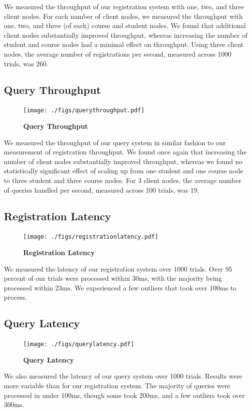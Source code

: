 \documentclass[sigplan, screen, 10pt]{acmart}
\begin{document}
We measured the throughput of our registration system with one, two, and three client nodes. For each number of client nodes, we measured the throughput with one, two, and three (of each) course and student nodes. We found that additional client nodes substantially improved throughput, whereas increasing the number of student and course nodes had a minimal effect on throughput. Using three client nodes, the average number of registrations per second, measured across 1000 trials, was 260.

\subsection{Query Throughput}
\begin{figure}[!htb]
  \centering
  \texttt{[image: ./figs/querythroughput.pdf]}
  \caption{
    \textbf{Query Throughput}
  }
\end{figure}
We measured the throughput of our query system in similar fashion to our measurement of registration throughput. We found once again that increasing the number of client nodes substantially improved throughput, whereas we found no statistically significant effect of scaling up from one student and one course node to three student and three course nodes. For 3 client nodes, the average number of queries handled per second, measured across 100 trials, was 19.

\subsection{Registration Latency}
\begin{figure}[!htb]
  \centering
  \texttt{[image: ./figs/registrationlatency.pdf]}
  \caption{
    \textbf{Registration Latency}
  }
\end{figure}
We measured the latency of our registration system over 1000 trials. Over 95 percent of our trials were processed within 30ms, with the majority being processed within 23ms. We experienced a few outliers that took over 100ms to process.

\subsection{Query Latency}
\begin{figure}[!htb]
  \centering
  \texttt{[image: ./figs/querylatency.pdf]}
  \caption{
    \textbf{Query Latency}
  }
\end{figure}
We also measured the latency of our query system over 1000 trials. Results were more variable than for our registration system. The majority of queries were processed in under 100ms, though some took 200ms, and a few outliers took over 300ms.
\end{document}
